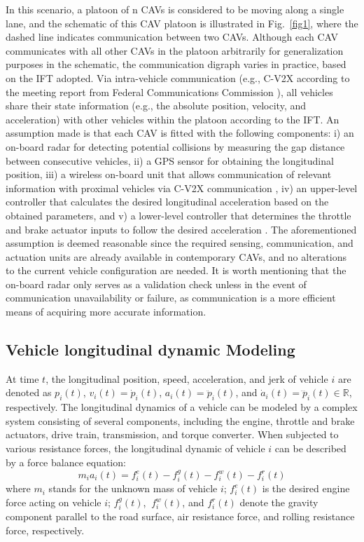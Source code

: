 \documentclass[a4paper]{cas-sc}
\begin{document}
In this scenario, a platoon of n CAVs is considered to be moving along a single lane, and the schematic of this CAV platoon is illustrated in Fig.~\ref{fig1}, where the dashed line indicates communication between two CAVs. Although each CAV communicates with all other CAVs in the platoon arbitrarily for generalization purposes in the schematic, the communication digraph varies in practice, based on the IFT adopted. Via intra-vehicle communication (e.g., C-V2X according to the meeting report from Federal Communications Commission \citep{VerizonNorth2020}), all vehicles share their state information (e.g., the absolute position, velocity, and acceleration) with other vehicles within the platoon according to the IFT. An assumption made is that each CAV is fitted with the following components: i) an on-board radar for detecting potential collisions by measuring the gap distance between consecutive vehicles, ii) a GPS sensor for obtaining the longitudinal position, iii) a wireless on-board unit that allows communication of relevant information with proximal vehicles via C-V2X communication \citep{VerizonNorth2020}, iv) an upper-level controller that calculates the desired longitudinal acceleration based on the obtained parameters, and v) a lower-level controller that determines the throttle and brake actuator inputs to follow the desired acceleration \citep{milanes2013cooperative}. The aforementioned assumption is deemed reasonable since the required sensing, communication, and actuation units are already available in contemporary CAVs, and no alterations to the current vehicle configuration are needed. It is worth mentioning that the on-board radar only serves as a validation check unless in the event of communication unavailability or failure, as communication is a more efficient means of acquiring more accurate information.


\subsection{Vehicle longitudinal dynamic Modeling}
\label{Section 3.1}

At time $t$, the longitudinal position, speed, acceleration, and jerk of vehicle $i$ are denoted as $p_i\left(t\right)$, $v_i\left(t\right)={\dot{p}}_i\left(t\right)$, $a_i\left(t\right)={\ddot{p}}_i\left(t\right)$, and ${\dot{a}}_i\left(t\right)={\dddot{p}}_i\left(t\right) \in \mathbb{R}$, respectively. The longitudinal dynamics of a vehicle can be modeled by a complex system consisting of several components, including the engine, throttle and brake actuators, drive train, transmission, and torque converter. When subjected to various resistance forces, the longitudinal dynamic of vehicle $i$ can be described by a force balance equation:
\begin{equation}
  m_ia_i(t)=f_i^e(t)-f_i^g(t)-f_i^w(t)-f_i^r(t)
  \label{eq2}
\end{equation}
where $m_i$ stands for the unknown mass of vehicle $i$; $f_i^e(t)$ is the desired engine force acting on vehicle $i$; $f_i^g(t)$, $\ f_i^w(t)$, and $f_i^r(t)$ denote the gravity component parallel to the road surface, air resistance force, and rolling resistance force, respectively.
\end{document}
